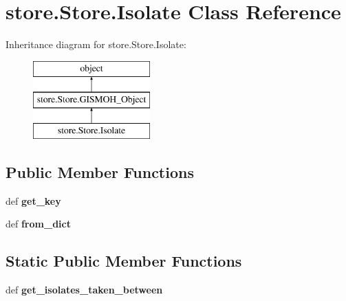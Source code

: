\hypertarget{classstore_1_1_store_1_1_isolate}{\section{store.\-Store.\-Isolate Class Reference}
\label{classstore_1_1_store_1_1_isolate}
}
Inheritance diagram for store.\-Store.\-Isolate\-:\begin{figure}[H]
\begin{center}
\leavevmode
\includegraphics[height=3.000000cm]{classstore_1_1_store_1_1_isolate}
\end{center}
\end{figure}
\subsection*{Public Member Functions}
\begin{DoxyCompactItemize}
\item 
\hypertarget{classstore_1_1_store_1_1_isolate_a5c16cc9d4271954b3ac7b15a1825e282}{def {\bfseries get\-\_\-key}}\label{classstore_1_1_store_1_1_isolate_a5c16cc9d4271954b3ac7b15a1825e282}

\item 
\hypertarget{classstore_1_1_store_1_1_isolate_ac1731fe05dad361255acb32bd5709041}{def {\bfseries from\-\_\-dict}}\label{classstore_1_1_store_1_1_isolate_ac1731fe05dad361255acb32bd5709041}

\end{DoxyCompactItemize}
\subsection*{Static Public Member Functions}
\begin{DoxyCompactItemize}
\item 
\hypertarget{classstore_1_1_store_1_1_isolate_abb9b3cf89c61fccfe95d5ec2aa13e962}{def {\bfseries get\-\_\-isolates\-\_\-taken\-\_\-between}}\label{classstore_1_1_store_1_1_isolate_abb9b3cf89c61fccfe95d5ec2aa13e962}

\end{DoxyCompactItemize}
